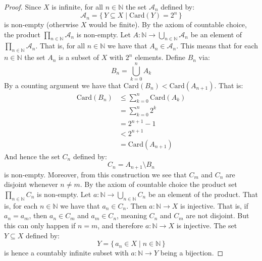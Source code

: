 \documentclass{article}
\theoremstyle{plain}
\theoremstyle{normal}
\begin{document}
        \begin{proof}
            Since $X$ is infinite, for all $n\in\mathbb{N}$ the set
            $\mathcal{A}_{n}$ defined by:
            \begin{equation}
                \mathcal{A}_{n}=\{\,Y\subseteq{X}\;|\;\textrm{Card}(Y)=2^{n}\,\}
            \end{equation}
            is non-empty (otherwise $X$ would be finite). By the axiom of
            countable choice, the product
            $\prod_{n\in\mathbb{N}}\mathcal{A}_{n}$ is non-empty. Let
            $A:\mathbb{N}\rightarrow\bigcup_{n\in\mathbb{N}}\mathcal{A}_{n}$ be
            an element of $\prod_{n\in\mathbb{N}}\mathcal{A}_{n}$. That is,
            for all $n\in\mathbb{N}$ we have that $A_{n}\in\mathcal{A}_{n}$.
            This means that for each $n\in\mathbb{N}$ the set $A_{n}$ is a
            subset of $X$ with $2^{n}$ elements. Define $B_{n}$ via:
            \begin{equation}
                B_{n}=\bigcup_{k=0}^{n}A_{k}
            \end{equation}
            By a counting argument we have that
            $\textrm{Card}(B_{n})<\textrm{Card}(A_{n+1})$. That is:
            \begin{align}
                \textrm{Card}(B_{n})
                &\leq\sum_{k=0}^{n}\textrm{Card}(A_{k})\\
                &=\sum_{k=0}^{n}2^{k}\\
                &=2^{n+1}-1\\
                &<2^{n+1}\\
                &=\textrm{Card}(A_{n+1})
            \end{align}
            And hence the set $C_{n}$ defined by:
            \begin{equation}
                C_{n}=A_{n+1}\setminus{B}_{n}
            \end{equation}
            is non-empty. Moreover, from this construction we see that
            $C_{m}$ and $C_{n}$ are disjoint whenever $n\ne{m}$. By the
            axiom of countable choice the product set
            $\prod_{n\in\mathbb{N}}C_{n}$ is non-empty. Let
            $a:\mathbb{N}\rightarrow\bigcup_{n\in\mathbb{N}}C_{n}$ be an
            element of the product. That is, for each
            $n\in\mathbb{N}$ we have that $a_{n}\in{C}_{n}$. Then
            $a:\mathbb{N}\rightarrow{X}$ is injective. That is, if
            $a_{n}=a_{m}$, then $a_{n}\in{C}_{m}$ and $a_{m}\in{C}_{n}$,
            meaning $C_{n}$ and $C_{m}$ are not disjoint. But this can only
            happen if $n=m$, and therefore $a:\mathbb{N}\rightarrow{X}$ is
            injective. The set $Y\subseteq{X}$ defined by:
            \begin{equation}
                Y=\{\,a_{n}\in{X}\;|\;n\in\mathbb{N}\,\}
            \end{equation}
            is hence a countably infinite subset
            with $a:\mathbb{N}\rightarrow{Y}$ being a bijection.
        \end{proof}
\end{document}
